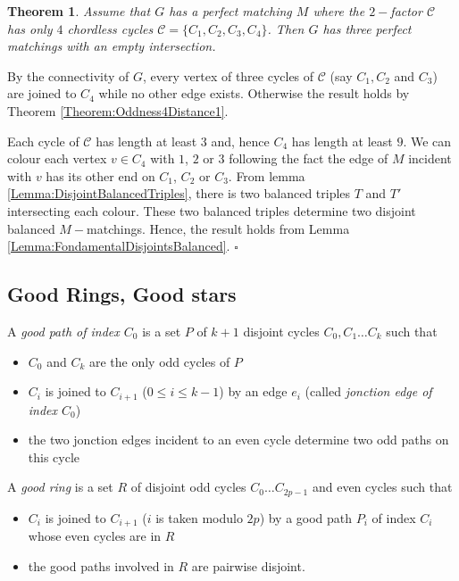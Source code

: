 \documentclass{elsart}
\theoremstyle{plain} \theoremheaderfont{\scshape}
\newtheorem{Thm}{\bf Theorem}
\newenvironment{Prf}{{\bf \noindent Proof } }{\hfill$\square$\\}
\begin{document}
\begin{Thm} \label{Theorem:4OddChordlessCycles}
Assume that $G$ has a perfect matching $M$ where the $2-$factor
$\mathcal C$ has only $4$ chordless cycles $\mathcal
C=\{C_1,C_2,C_3,C_4\}$. Then $G$ has three perfect matchings with an
empty intersection.
\end{Thm}
\begin{Prf}
By the connectivity of $G$, every vertex of three cycles of
$\mathcal C$ (say $C_1,C_2$ and $C_3$) are joined to $C_4$ while no
other edge exists. Otherwise the result holds by Theorem
\ref{Theorem:Oddness4Distance1}.

Each cycle of $\mathcal C$ has length at least $3$ and, hence $C_4$
has length at least $9$. We can colour each vertex $v \in C_4$ with
$1$, $2$ or $3$ following the fact the edge of $M$ incident with $v$
has its other end on $C_1$, $C_2$ or $C_3$. From lemma
\ref{Lemma:DisjointBalancedTriples}, there is two balanced triples
$T$ and $T'$ intersecting  each colour. These two balanced triples
determine two disjoint balanced $M-$matchings. Hence, the result
holds from Lemma \ref{Lemma:FondamentalDisjointsBalanced}.
\end{Prf}

\subsection{Good Rings, Good stars}

A {\em good path of index $C_0$} is a set $P$ of $k+1$ disjoint
cycles $C_0,C_1 \ldots C_k$ such that

\begin{itemize}
  \item $C_0$ and $C_k$ are the only odd cycles of $P$
  \item $C_i$ is joined to $C_{i+1}$ ($0 \leq i \leq k-1$)  by an
  edge $e_i$ (called {\em jonction edge of index $C_0$})
  \item the two jonction edges incident to an even cycle
  determine two odd paths on this cycle
\end{itemize}



A {\em good ring} is a set $R$ of disjoint odd cycles $C_0 \ldots
C_{2p-1}$ and even cycles such that
\begin{itemize}
  \item $C_i$ is joined to $C_{i+1}$ ($i$ is taken modulo $2p$) by a
  good path $P_i$ of index $C_i$ whose even cycles are in $R$
  \item the good paths involved in $R$ are pairwise disjoint.
\end{itemize}
\end{document}
